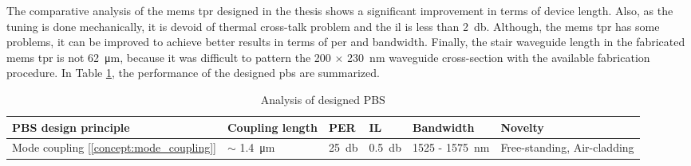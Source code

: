 \documentclass[../report.tex]{subfiles}
\begin{document}
The comparative analysis of the \gls{mems} \gls{tpr} designed in the thesis shows a significant improvement in terms of device length. Also, as the tuning is done mechanically, it is devoid of thermal cross-talk problem and the \gls{il} is less than \SI{2}{\decibel}. Although, the \gls{mems} \gls{tpr} has some problems, it can be improved to achieve better results in terms of \gls{per} and bandwidth. Finally, the stair waveguide length in the fabricated \gls{mems} \gls{tpr} is not \SI{62}{\micro \meter}, because it was difficult to pattern the 200 $\times$ \SI{230}{\nano \meter} waveguide cross-section with the available fabrication procedure. In Table \ref{table:pbs_summary}, the performance of the designed \gls{pbs} are summarized.

\begin {table}[H]
\begin{center} 
	\begin{tabular}{ | m{7em} | m{1.9cm}| m{1.3cm} | m{1.3cm} | m{7em} | m{7em} | }  
		\hline
		\textbf{PBS design principle} & \textbf{Coupling length} & \textbf{PER} & \textbf{IL} & \textbf{Bandwidth} & \textbf{Novelty}\\ [1.5ex]
		\hline\hline
		Mode coupling [\ref{concept:mode_coupling}] & $\sim$ \SI{1.4}{\micro \meter} & \SI{25}{\decibel} & \SI{0.5}{\decibel} & 1525 - \SI{1575}{\nano \meter} & Free-standing, Air-cladding \\ 
		\hline	
	\end{tabular}
\end{center}
\caption {Analysis of designed PBS} 
\label{table:pbs_summary} 
\end {table}
\end{document}
